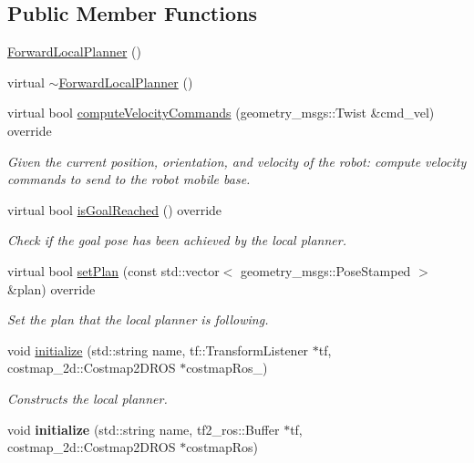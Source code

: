 \subsection*{Public Member Functions}
\begin{DoxyCompactItemize}
\item 
\hyperlink{classforward__local__planner_1_1ForwardLocalPlanner_a799b88b11a20f65c49f08090092de578}{Forward\+Local\+Planner} ()
\item 
virtual \hyperlink{classforward__local__planner_1_1ForwardLocalPlanner_ac842ee5e8465cb9038adf5596b5c4469}{$\sim$\+Forward\+Local\+Planner} ()
\item 
virtual bool \hyperlink{classforward__local__planner_1_1ForwardLocalPlanner_af66bd75aa18afa2f027f1951dfe18b41}{compute\+Velocity\+Commands} (geometry\+\_\+msgs\+::\+Twist \&cmd\+\_\+vel) override
\begin{DoxyCompactList}\small\item\em Given the current position, orientation, and velocity of the robot\+: compute velocity commands to send to the robot mobile base. \end{DoxyCompactList}\item 
virtual bool \hyperlink{classforward__local__planner_1_1ForwardLocalPlanner_a76d7b463fbe432b6af22d12270a1c2bd}{is\+Goal\+Reached} () override
\begin{DoxyCompactList}\small\item\em Check if the goal pose has been achieved by the local planner. \end{DoxyCompactList}\item 
virtual bool \hyperlink{classforward__local__planner_1_1ForwardLocalPlanner_a63db153f4977a9336dc992cb92415cd7}{set\+Plan} (const std\+::vector$<$ geometry\+\_\+msgs\+::\+Pose\+Stamped $>$ \&plan) override
\begin{DoxyCompactList}\small\item\em Set the plan that the local planner is following. \end{DoxyCompactList}\item 
void \hyperlink{classforward__local__planner_1_1ForwardLocalPlanner_a0ae17e1f6fd009d1ec223135891a548a}{initialize} (std\+::string name, tf\+::\+Transform\+Listener $\ast$tf, costmap\+\_\+2d\+::\+Costmap2\+D\+R\+OS $\ast$costmap\+Ros\+\_\+)
\begin{DoxyCompactList}\small\item\em Constructs the local planner. \end{DoxyCompactList}\item 
void {\bfseries initialize} (std\+::string name, tf2\+\_\+ros\+::\+Buffer $\ast$tf, costmap\+\_\+2d\+::\+Costmap2\+D\+R\+OS $\ast$costmap\+Ros)\hypertarget{classforward__local__planner_1_1ForwardLocalPlanner_a62a79a2c97359b566419731e3f2d0175}{}\label{classforward__local__planner_1_1ForwardLocalPlanner_a62a79a2c97359b566419731e3f2d0175}


\end{DoxyCompactItemize}

